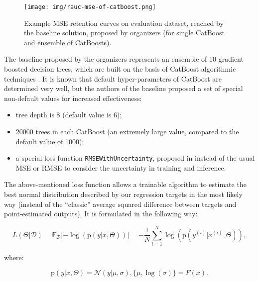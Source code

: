 \documentclass{article}
\begin{document}
\begin{figure*}[hbt!]
 \centering
\begin{minipage}[h]{0.8\linewidth}
  \centering
  \centerline{\texttt{[image: img/rauc-mse-of-catboost.png]}}
  \vspace{-0.1cm}
\end{minipage}
 \caption{Example MSE retention curves on evaluation dataset, reached by the baseline solution, proposed by organizers (for single CatBoost and ensemble of CatBoosts). \cite{Malinin2021shifts}}
 \label{fig:rauc-mse-example}
\end{figure*}

The baseline proposed by the organizers represents an ensemble of 10 gradient boosted decision trees, which are built on the basis of CatBoost algorithmic techniques \cite{Ostroumova2018catboost}. It is known that default hyper-parameters of CatBoost are determined very well, but the authors of the baseline proposed a set of special non-default values for increased effectiveness:

\begin{itemize}
  \item tree depth is 8 (default value is 6);
  \item 20000 trees in each CatBoost (an extremely large value, compared to the default value of 1000);
  \item a special loss function \verb+RMSEWithUncertainty+, proposed in \cite{Malinin2021gbtuncertainty} instead of the usual MSE or RMSE to consider the uncertainty in training and inference.
\end{itemize}

The above-mentioned loss function allows a trainable algorithm to estimate the best normal distribution described by our regression targets in the most likely way (instead of the “classic” average squared difference between targets and point-estimated outputs). It is formulated in the following way:

\begin{equation}
\label{eq:loss}
    L(\Theta|\mathcal{D}) = \mathbb{E}_{\mathcal{D}}\lbrack-\log\left(\mathrm{p}(y|x, \Theta)\right)\rbrack = -\frac{1}{N} \displaystyle\sum_{i=1}^{N} \log\left(\mathrm{p}(y^{(i)}|x^{(i)}, \Theta)\right),
\end{equation}

where:

\begin{equation}
\label{eq:normal-distr}
\mathrm{p}(y|x, \Theta) = \mathcal{N}(y|\mu, \sigma), \{\mu, \log(\sigma)\} = F(x).
\end{equation}
\end{document}
